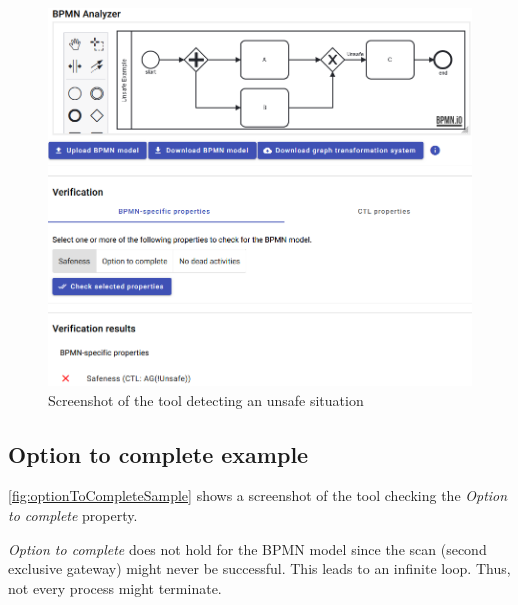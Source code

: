 \documentclass[runningheads]{llncs}
\begin{document}
\begin{figure}[ht]
    \centering
    \includegraphics[width=1\textwidth]{artifacts/appendix/unsafe_sample.png}
    \caption{Screenshot of the tool detecting an unsafe situation}
    \label{fig:unsafeSample}
\end{figure}

\subsection{Option to complete example}
\autoref{fig:optionToCompleteSample} shows a screenshot of the tool checking the \textit{Option to complete} property.

\textit{Option to complete} does not hold for the BPMN model since the scan (second exclusive gateway) might never be successful.
This leads to an infinite loop.
Thus, not every process might terminate.
\end{document}
